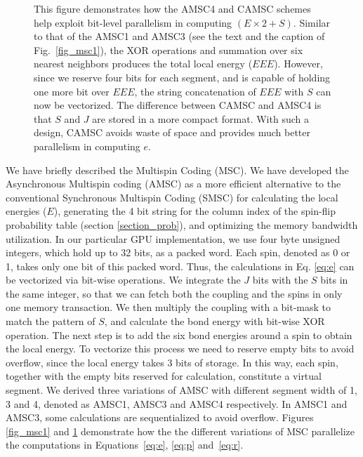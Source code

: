 \begin{figure}
\caption{This figure demonstrates how the AMSC4 and CAMSC schemes help
  exploit bit-level parallelism in computing $(E \times 2 + S)$.
  Similar to that of the AMSC1 and AMSC3 (see the text and the caption
  of Fig.~\ref{fig_msc1}), the XOR operations and summation over six
  nearest neighbors produces the total local energy ($EEE$).  However,
  since we reserve four bits for each segment, and is capable of
  holding one more bit over $EEE$, the string concatenation of $EEE$
  with $S$ can now be vectorized.  The difference between CAMSC and
  AMSC4 is that $S$ and $J$ are stored in a more compact format. With
  such a design, CAMSC avoids waste of space and provides much better
  parallelism in computing $e$. }
  \label{fig_msc2}
\end{figure}


We have briefly described the Multispin Coding (MSC). We have developed the 
Asynchronous Multispin coding (AMSC) as a more efficient
alternative to the conventional Synchronous Multispin Coding (SMSC)
for calculating the local energies ($E$), generating the 4 bit string
for the column index of the spin-flip probability table (section
\ref{section_prob}), and optimizing the memory bandwidth
utilization. In our particular GPU implementation, we use four byte
unsigned integers, which hold up to 32 bits, as a packed word. Each
spin, denoted as 0 or 1, takes only one bit of this packed word. Thus, the
calculations in Eq. \ref{eq:e} can be vectorized via bit-wise
operations. We integrate the $J$ bits with the $S$ bits in the same
integer, so that we can fetch both the coupling and the spins in only
one memory transaction. We then multiply the coupling with a bit-mask
to match the pattern of $S$, and calculate the bond energy with
bit-wise XOR operation. The next step is to add the six bond energies
around a spin to obtain the local energy.  To vectorize this process
we need to reserve empty bits to avoid overflow, since the local
energy takes 3 bits of storage. In this way, each spin, together with
the empty bits reserved for calculation, constitute a virtual segment.
We derived three variations of AMSC with different segment width of 1, 3 and 4, denoted as 
AMSC1, AMSC3 and AMSC4 respectively. In AMSC1 and AMSC3, some calculations are 
sequentialized to avoid overflow. Figures \ref{fig_msc1} and \ref{fig_msc2} demonstrate how the  
the different variations of MSC parallelize the computations in Equations~\ref{eq:e}, \ref{eq:p} 
and~\ref{eq:r}. 

